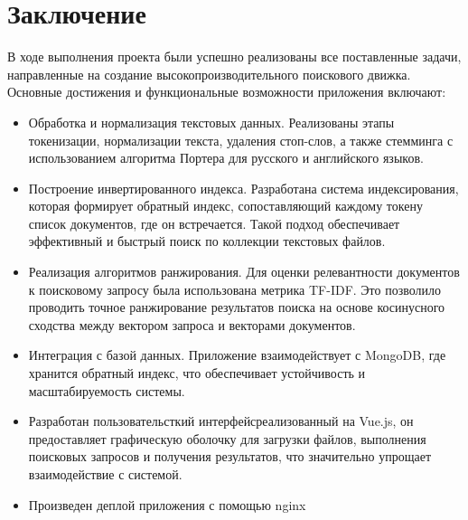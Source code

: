 \section{Заключение}

В ходе выполнения проекта были успешно реализованы все поставленные задачи, направленные на создание 
высокопроизводительного поискового движка. Основные достижения и функциональные возможности приложения включают:
\begin{itemize}
    \item Обработка и нормализация текстовых данных. Реализованы этапы токенизации, нормализации текста, 
    удаления стоп-слов, а также стемминга с использованием алгоритма 
    Портера для русского и английского языков.
    \item Построение инвертированного индекса. Разработана система индексирования, которая формирует обратный индекс, 
    сопоставляющий каждому токену список документов, где он встречается. Такой подход обеспечивает эффективный и 
    быстрый поиск по коллекции текстовых файлов.
    \item Реализация алгоритмов ранжирования. Для оценки релевантности документов к поисковому запросу была
    использована метрика TF-IDF. Это позволило проводить точное ранжирование результатов поиска на основе косинусного 
    сходства между вектором запроса и векторами документов.
    \item Интеграция с базой данных. Приложение взаимодействует с MongoDB, где хранится обратный 
    индекс, что обеспечивает устойчивость и масштабируемость системы.
    \item Разработан пользовательсткий интерфейсреализованный на Vue.js, он предоставляет 
    графическую оболочку для загрузки файлов, выполнения поисковых запросов и получения результатов, что значительно 
    упрощает взаимодействие с системой.
    \item Произведен деплой приложения с помощью nginx
\end{itemize}